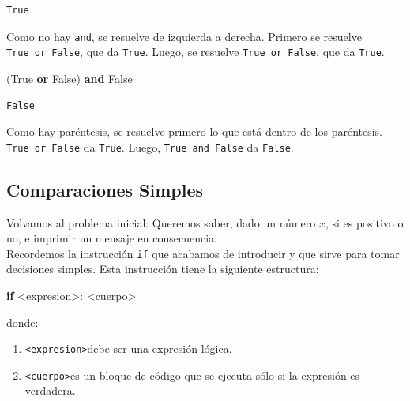 \documentclass[
  letterpaper,
  DIV=11,
  numbers=noendperiod]{scrreprt}
\newenvironment{Shaded}{\begin{snugshade}}{\end{snugshade}}
\newcommand{\ControlFlowTok}[1]{\textcolor[rgb]{0.00,0.23,0.31}{\textbf{#1}}}
\newcommand{\KeywordTok}[1]{\textcolor[rgb]{0.00,0.23,0.31}{\textbf{#1}}}
\newcommand{\NormalTok}[1]{\textcolor[rgb]{0.00,0.23,0.31}{#1}}
\newcommand{\OperatorTok}[1]{\textcolor[rgb]{0.37,0.37,0.37}{#1}}
\newcommand{\VariableTok}[1]{\textcolor[rgb]{0.07,0.07,0.07}{#1}}
\providecommand{\tightlist}{%
  \setlength{\itemsep}{0pt}\setlength{\parskip}{0pt}}\usepackage{longtable,booktabs,array}
\begin{document}
\begin{tcolorbox}
\begin{verbatim}
True
\end{verbatim}

Como no hay \texttt{and}, se resuelve de izquierda a derecha. Primero se
resuelve \texttt{True\ or\ False}, que da \texttt{True}. Luego, se
resuelve \texttt{True\ or\ False}, que da \texttt{True}.

\begin{Shaded}
\begin{Highlighting}[]
\NormalTok{(}\VariableTok{True} \KeywordTok{or} \VariableTok{False}\NormalTok{) }\KeywordTok{and} \VariableTok{False}
\end{Highlighting}
\end{Shaded}

\begin{verbatim}
False
\end{verbatim}

Como hay paréntesis, se resuelve primero lo que está dentro de los
paréntesis. \texttt{True\ or\ False} da \texttt{True}. Luego,
\texttt{True\ and\ False} da \texttt{False}.

\end{tcolorbox}

\subsection{Comparaciones Simples}\label{comparaciones-simples}

Volvamos al problema inicial: Queremos saber, dado un número \(x\), si
es positivo o no, e imprimir un mensaje en consecuencia.\\
Recordemos la instrucción \texttt{if} que acabamos de introducir y que
sirve para tomar decisiones simples. Esta instrucción tiene la siguiente
estructura:

\begin{Shaded}
\begin{Highlighting}[]
\ControlFlowTok{if} \OperatorTok{\textless{}}\NormalTok{expresion}\OperatorTok{\textgreater{}}\NormalTok{:}
    \OperatorTok{\textless{}}\NormalTok{cuerpo}\OperatorTok{\textgreater{}}
\end{Highlighting}
\end{Shaded}

donde:

\begin{enumerate}
\def\labelenumi{\arabic{enumi}.}
\tightlist
\item
  \texttt{\textless{}expresion\textgreater{}}debe ser una expresión
  lógica.
\item
  \texttt{\textless{}cuerpo\textgreater{}}es un bloque de código que se
  ejecuta sólo si la expresión es verdadera.
\end{enumerate}
\end{document}
